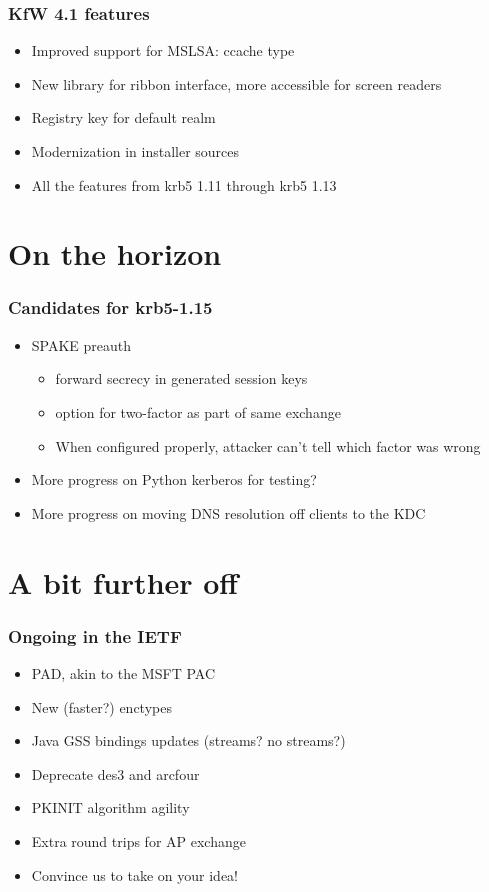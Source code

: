\documentclass{beamer}
\begin{document}
\begin{frame}
\frametitle{KfW 4.1 features}
\begin{itemize}
\item{Improved support for MSLSA: ccache type}
\item{New library for ribbon interface, more accessible for screen readers}
\item{Registry key for default realm}
\item{Modernization in installer sources}
\item{All the features from krb5 1.11 through krb5 1.13}
\end{itemize}
\end{frame}

\section{On the horizon}

\begin{frame}
\frametitle{Candidates for krb5-1.15}
\begin{itemize}
\item{SPAKE preauth}
	\begin{itemize}
	\item{forward secrecy in generated session keys}
	\item{option for two-factor as part of same exchange}
	\item{When configured properly, attacker can't tell which factor was
		wrong}
	\end{itemize}
\item{More progress on Python kerberos for testing?}
\item{More progress on moving DNS resolution off clients to the KDC}
\end{itemize}
\end{frame}

\section{A bit further off}

\begin{frame}
\frametitle{Ongoing in the IETF}
\begin{itemize}
\item{PAD, akin to the MSFT PAC}
\item{New (faster?) enctypes}
\item{Java GSS bindings updates (streams?  no streams?)}
\item{Deprecate des3 and arcfour}
\item{PKINIT algorithm agility}
\item{Extra round trips for AP exchange}
\item{Convince us to take on your idea!}
\end{itemize}
\end{frame}
\end{document}
